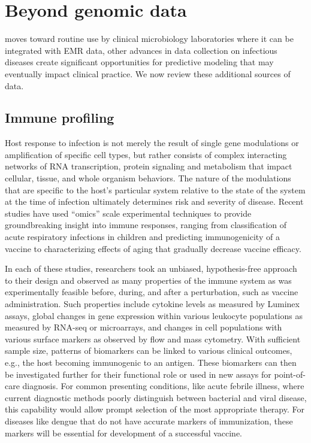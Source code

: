 \section{Beyond genomic data}

 moves toward routine use by clinical microbiology laboratories where it can be integrated with EMR data, other advances in data collection on infectious diseases create significant opportunities for predictive modeling that may eventually impact clinical practice. We now review these additional sources of data.

\subsection{Immune profiling}

Host response to infection is not merely the result of single gene modulations or amplification of specific cell types, but rather consists of complex interacting networks of RNA transcription, protein signaling and metabolism that impact cellular, tissue, and whole organism behaviors. The nature of the modulations that are specific to the host’s particular system relative to the state of the system at the time of infection ultimately determines risk and severity of disease. Recent studies have used “omics” scale experimental techniques to provide groundbreaking insight into immune responses, ranging from classification of acute respiratory infections in children\autocite{Mejias2014} and predicting immunogenicity of a vaccine\autocite{Querec2009,Furman2013} to characterizing effects of aging that gradually decrease vaccine efficacy.\autocite{Poland2014}

In each of these studies, researchers took an unbiased, hypothesis-free approach to their design and observed as many properties of the immune system as was experimentally feasible before, during, and after a perturbation, such as vaccine administration. Such properties include cytokine levels as measured by Luminex assays, global changes in gene expression within various leukocyte populations as measured by RNA-seq or microarrays, and changes in cell populations with various surface markers as observed by flow and mass cytometry. With sufficient sample size, patterns of biomarkers can be linked to various clinical outcomes, e.g., the host becoming immunogenic to an antigen. These biomarkers can then be investigated further for their functional role or used in new assays for point-of-care diagnosis. For common presenting conditions, like acute febrile illness, where current diagnostic methods poorly distinguish between bacterial and viral disease, this capability would allow prompt selection of the most appropriate therapy.\autocite{Mejias2014} For diseases like dengue that do not have accurate markers of immunization, these markers will be essential for development of a successful vaccine.\autocite{Mahalingam2013}

